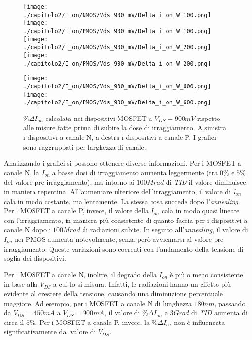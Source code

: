 \begin{figure}[h]
    \centering
    \texttt{[image: ./capitolo2/I\_on/NMOS/Vds\_900\_mV/Delta\_i\_on\_W\_100.png]}
    \texttt{[image: ./capitolo2/I\_on/PMOS/Vds\_900\_mV/Delta\_i\_on\_W\_100.png]}\\
    \vspace{0.2cm}
    \texttt{[image: ./capitolo2/I\_on/NMOS/Vds\_900\_mV/Delta\_i\_on\_W\_200.png]}
    \texttt{[image: ./capitolo2/I\_on/PMOS/Vds\_900\_mV/Delta\_i\_on\_W\_200.png]}\\
    \vspace{0.2cm}

    \texttt{[image: ./capitolo2/I\_on/NMOS/Vds\_900\_mV/Delta\_i\_on\_W\_600.png]}
    \texttt{[image: ./capitolo2/I\_on/PMOS/Vds\_900\_mV/Delta\_i\_on\_W\_600.png]}

    \caption[Dati $\% \Delta I_{on}$ a $V_{DS}=900mV$ ]{$\% \Delta I_{on}$ calcolata nei dispositivi MOSFET a $V_{DS} = 900mV$ rispetto alle misure fatte prima di subire la dose di irraggiamento. A sinistra i dispositivi a canale N, a destra i dispositivi a canale P. I grafici sono raggruppati per larghezza di canale.}
    \label{fig:delta_I_on_vds_900_mv}

\end{figure}


Analizzando i grafici si possono ottenere diverse informazioni.
Per i MOSFET a canale N, la $I_{on}$ a basse dosi di irraggiamento aumenta leggermente (tra $0\%$ e $5\%$ del valore pre-irraggiamento), ma intorno ai $100 Mrad$ di \emph{TID} il valore diminuisce in maniera repentina. All'aumentare ulteriore dell'irraggiamento, il valore di $I_{on}$ cala in modo costante, ma lentamente. La stessa cosa succede dopo l'\emph{annealing}. Per i MOSFET a canale P, invece, il valore della $I_{on}$ cala in modo quasi lineare con l'irraggiamento, in maniera più consistente di quanto faccia per i dispositivi a canale N dopo i $100 Mrad$ di radiazioni subite. In seguito all'\emph{annealing}, il valore di $I_{on}$ nei PMOS aumenta notevolmente, senza però avvicinarsi al valore pre-irraggiamento. Queste variazioni sono coerenti con l'andamento della tensione di soglia dei dispositivi. 

Per i MOSFET a canale N, inoltre, il degrado della $I_{on}$ è più o meno consistente in base alla $V_{DS}$ a cui lo si misura. Infatti, le radiazioni hanno un effetto più evidente al crescere della tensione, causando una diminuzione percentuale maggiore. Ad esempio, per i MOSFET a canale N di lunghezza $180 nm$, passando da $V_{DS} = 450mA$ a $V_{DS} = 900 mA$, il valore di $\% \Delta I_{on}$ a $3 Grad$ di \emph{TID} aumenta di circa il $5\%$. Per i MOSFET a canale P, invece, la $\% \Delta I_{on}$ non è influenzata significativamente dal valore di $V_{DS}$.

